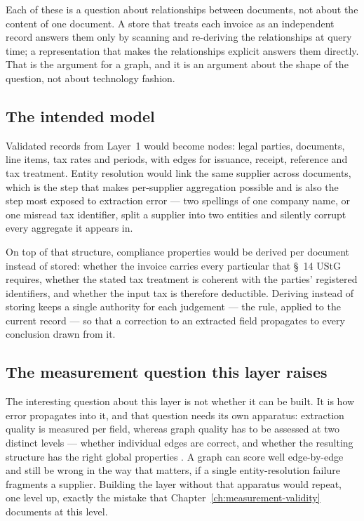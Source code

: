Each of these is a question about relationships between documents, not about the content of one
document. A store that treats each invoice as an independent record answers them only by
scanning and re-deriving the relationships at query time; a representation that makes the
relationships explicit answers them directly. That is the argument for a graph, and it is an
argument about the shape of the question, not about technology fashion.

\subsection{The intended model}

Validated records from Layer~1 would become nodes: legal parties, documents, line items, tax
rates and periods, with edges for issuance, receipt, reference and tax treatment. Entity
resolution would link the same supplier across documents, which is the step that makes
per-supplier aggregation possible and is also the step most exposed to extraction error --- two
spellings of one company name, or one misread tax identifier, split a supplier into two
entities and silently corrupt every aggregate it appears in.

On top of that structure, compliance properties would be derived per document instead of
stored: whether the invoice carries every particular that \S~14 \ac{UStG} requires, whether the
stated tax treatment is coherent with the parties' registered identifiers, and whether the
input tax is therefore deductible. Deriving instead of storing keeps a single
authority for each judgement --- the rule, applied to the current record --- so that a
correction to an extracted field propagates to every conclusion drawn from it.

\subsection{The measurement question this layer raises}

The interesting question about this layer is not whether it can be built. It is how error
propagates into it, and that question needs its own apparatus: extraction quality is measured
per field, whereas graph quality has to be assessed at two distinct levels --- whether
individual edges are correct, and whether the resulting structure has the right global
properties \parencite{cai2025}. A graph can score well edge-by-edge and still be wrong in the way
that matters, if a single entity-resolution failure fragments a supplier. Building the layer
without that apparatus would repeat, one level up, exactly the mistake that
Chapter~\ref{ch:measurement-validity} documents at this level.

